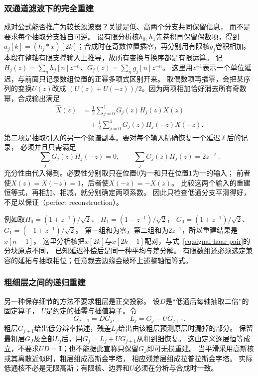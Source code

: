 \subsubsection{双通道滤波下的完全重建}
\label{sec:signal-perfect-reconstruction}
成对公式能否推广为较长滤波器？关键是低、高两个分支共同保留信息，
而不是要求每个抽取分支独自可逆。
设有限分析核$h_0,h_1$先卷积再保留偶数项，得到
$a_j[k]=(h_j*x)[2k]$；合成时在奇数位置插零，再分别用有限核$g_j$卷积相加。
本段在整轴有限支撑输入上推导，故所有变换与换序都是有限运算。
记$H_j(z)=\sum_nh_j[n]z^{-n}$、$G_j(z)=\sum_ng_j[n]z^{-n}$。
这里用$z^{-1}$表示一个单位延迟，与前面只记录数组位置的正幂多项式区别开来。
取偶数项再插零，会把某序列的变换$U(z)$改成
$(U(z)+U(-z))/2$。因为两项相加恰好消去所有奇数幂，合成输出满足
\begin{equation}
 \begin{aligned}
 \widehat X(z)&=\frac12\sum_{j=0}^1G_j(z)H_j(z)X(z)\\
 &\quad+\frac12\sum_{j=0}^1G_j(z)H_j(-z)X(-z).
 \end{aligned}
 \label{eq:signal-two-channel-transfer}
\end{equation}
第二项是抽取引入的另一个频谱副本。要对每个输入精确恢复一个延迟$\ell$后的记录，
必须并且只需满足
\begin{equation}
 \sum_jG_j(z)H_j(-z)=0,\qquad
 \sum_jG_j(z)H_j(z)=2z^{-\ell}.
 \label{eq:signal-perfect-reconstruction-conditions}
\end{equation}
充分性由代入得到。必要性分别取只在位置$0$为一和只在位置$1$为一的输入；
前者使$X(z)=X(-z)=1$，后者使$X(-z)=-X(z)$。
比较这两个输入的重建恒等式，再相加、相减，就分别确定两项系数。
因此只检查低通分支平滑得好，不足以保证（perfect reconstruction）。

例如取$H_0=(1+z^{-1})/\sqrt2$、
$H_1=(1-z^{-1})/\sqrt2$，
$G_0=(1+z^{-1})/\sqrt2$、
$G_1=(-1+z^{-1})/\sqrt2$。
第一组和为零，第二组和为$2z^{-1}$，所以重建结果是$x[n-1]$。
这里分析核把$x[2k]$与$x[2k-1]$配对，与式~\eqref{eq:signal-haar-pair}的分块原点不同，
已知延迟补偿后是同一种平均与差分解。
有限数组还必须选定兼容的延拓与抽取相位；任意裁去边缘会破坏上述整轴恒等式。

\subsubsection{粗细层之间的递归重建}
\label{sec:signal-pyramid-reconstruction}
另一种保存细节的方法不要求粗层是正交投影。
设$D$是“低通后每轴抽取二倍”的固定算子，
$U$是约定的插零与插值算子。令
\begin{equation}
 G_{j+1}=DG_j,\qquad L_j=G_j-UG_{j+1}.
 \label{eq:signal-laplacian-pyramid}
\end{equation}
粗层$G_{j+1}$给出低分辨率描述，残差$L_j$给出由该粗层预测原层时漏掉的部分。
保留最粗层$G_J$及全部$L_j$后，用$G_j=L_j+UG_{j+1}$从粗到细恢复。
这由定义逐层恒等成立，不要求$UD=\bm I$；也不能据此宣称只保留$G_J$即可无损重建。
当平滑采用高斯核或其离散近似时，粗层组成高斯金字塔，
相应残差层组成拉普拉斯金字塔。
实际低通核不必是无限高斯；有限核、边界和$U$必须在分析与合成时一致。

